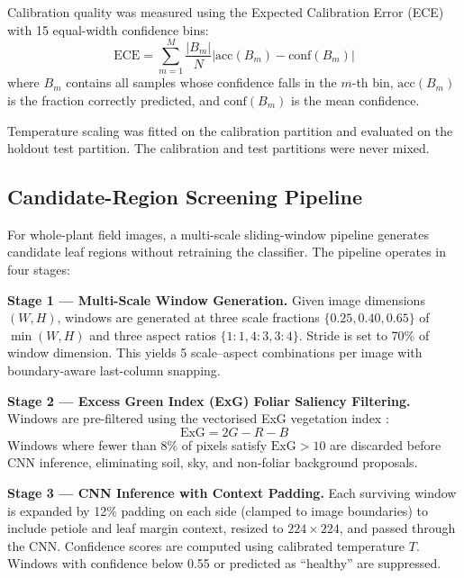 \documentclass[pdflatex,sn-mathphys-num]{sn-jnl}
\theoremstyle{thmstyleone}%
\theoremstyle{thmstyletwo}%
\theoremstyle{thmstylethree}%
\begin{document}
Calibration quality was measured using the Expected Calibration Error (ECE) with 15
equal-width confidence bins:
\begin{equation}
  \text{ECE} = \sum_{m=1}^{M} \frac{|B_m|}{N}
  \left|\text{acc}(B_m) - \text{conf}(B_m)\right|
  \label{eq:ece}
\end{equation}
where $B_m$ contains all samples whose confidence falls in the $m$-th bin,
$\text{acc}(B_m)$ is the fraction correctly predicted, and $\text{conf}(B_m)$ is the
mean confidence.

Temperature scaling was fitted on the calibration partition and evaluated on the
holdout test partition. The calibration and test partitions were never mixed.

\subsection{Candidate-Region Screening Pipeline}
\label{sec:screening_pipeline}

For whole-plant field images, a multi-scale sliding-window pipeline generates candidate
leaf regions without retraining the classifier. The pipeline operates in four stages:

\textbf{Stage 1 — Multi-Scale Window Generation.}
Given image dimensions $(W, H)$, windows are generated at three scale fractions
$\{0.25, 0.40, 0.65\}$ of $\min(W, H)$ and three aspect ratios $\{1{:}1, 4{:}3, 3{:}4\}$.
Stride is set to 70\% of window dimension. This yields 5 scale--aspect combinations per
image with boundary-aware last-column snapping.

\textbf{Stage 2 — Excess Green Index (ExG) Foliar Saliency Filtering.}
Windows are pre-filtered using the vectorised ExG vegetation index
\citep{woebbecke1995color}:
\begin{equation}
  \text{ExG} = 2G - R - B
  \label{eq:exg}
\end{equation}
Windows where fewer than 8\% of pixels satisfy $\text{ExG} > 10$ are discarded before
CNN inference, eliminating soil, sky, and non-foliar background proposals.

\textbf{Stage 3 — CNN Inference with Context Padding.}
Each surviving window is expanded by 12\% padding on each side (clamped to image
boundaries) to include petiole and leaf margin context, resized to $224 \times 224$,
and passed through the CNN. Confidence scores are computed using calibrated temperature
$T$. Windows with confidence below 0.55 or predicted as ``healthy'' are suppressed.
\end{document}

